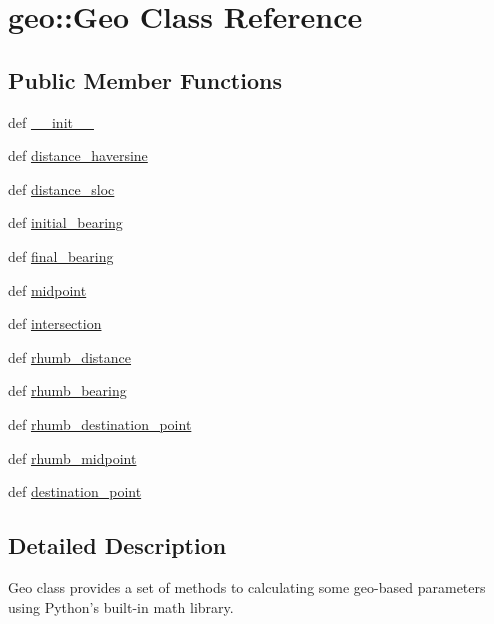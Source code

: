\hypertarget{classgeo_1_1Geo}{
\section{geo::Geo Class Reference}
\label{classgeo_1_1Geo}
}
\subsection*{Public Member Functions}
\begin{DoxyCompactItemize}
\item 
def \hyperlink{classgeo_1_1Geo_a05c4775ff1361a93243f7a4af5322f09}{\_\-\_\-init\_\-\_\-}
\item 
def \hyperlink{classgeo_1_1Geo_a33eddcd1d8d9c50218da0d4af9c18647}{distance\_\-haversine}
\item 
def \hyperlink{classgeo_1_1Geo_a6c1debeb7971d51ddd7d0d9bdbd4427c}{distance\_\-sloc}
\item 
def \hyperlink{classgeo_1_1Geo_ae565566c5d90208ea5f67656f52d0092}{initial\_\-bearing}
\item 
def \hyperlink{classgeo_1_1Geo_a14e0f58bfe4e3a6f06fcf3491213dbaf}{final\_\-bearing}
\item 
def \hyperlink{classgeo_1_1Geo_a01bb745c04b570ee52b9c464cc5e2f82}{midpoint}
\item 
def \hyperlink{classgeo_1_1Geo_a186e47d14da8b081664a5ae701db494c}{intersection}
\item 
def \hyperlink{classgeo_1_1Geo_aa7a656b695ac9938e4064a32df34ca4b}{rhumb\_\-distance}
\item 
def \hyperlink{classgeo_1_1Geo_a694ce89fb8fc71fa670bf10a7aed202a}{rhumb\_\-bearing}
\item 
def \hyperlink{classgeo_1_1Geo_a8a38f7e50bce307533860ad569530478}{rhumb\_\-destination\_\-point}
\item 
def \hyperlink{classgeo_1_1Geo_acaad81d93d99d1193ed36fb229ccfe35}{rhumb\_\-midpoint}
\item 
def \hyperlink{classgeo_1_1Geo_a5b6b3ddad6ac576c393336349530bccf}{destination\_\-point}
\end{DoxyCompactItemize}


\subsection{Detailed Description}
\begin{DoxyVerb}Geo class provides a set of methods to calculating some geo-based parameters using 
    Python's built-in math library.\end{DoxyVerb}
 

